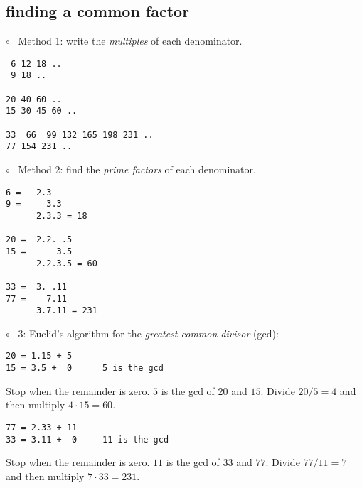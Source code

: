 \documentclass[11pt, oneside]{article}
\begin{document}
\subsection*{finding a common factor}
$\circ$ \ Method 1:  write the \emph{multiples} of each denominator.
\begin{verbatim}
 6 12 18 ..
 9 18 ..
 
20 40 60 ..
15 30 45 60 ..

33  66  99 132 165 198 231 ..
77 154 231 ..
\end{verbatim}
$\circ$ \ Method 2:  find the \emph{prime factors} of each denominator.
\begin{verbatim}
6 =   2.3    
9 =     3.3
      2.3.3 = 18
 
20 =  2.2. .5     
15 =      3.5
      2.2.3.5 = 60

33 =  3. .11
77 =    7.11
      3.7.11 = 231
\end{verbatim}
$\circ$ \ 3: Euclid's algorithm for the \emph{greatest common divisor} (gcd):
\begin{verbatim}
20 = 1.15 + 5
15 = 3.5 +  0      5 is the gcd
\end{verbatim}
Stop when the remainder is zero.  $5$ is the gcd of $20$ and $15$.  Divide $20/5 = 4$ and then multiply $4 \cdot 15 = 60$.
\begin{verbatim}
77 = 2.33 + 11
33 = 3.11 +  0     11 is the gcd
\end{verbatim}
Stop when the remainder is zero.  $11$ is the gcd of $33$ and $77$.  Divide $77/11 = 7$ and then multiply $7 \cdot 33 = 231$.
\end{document}
